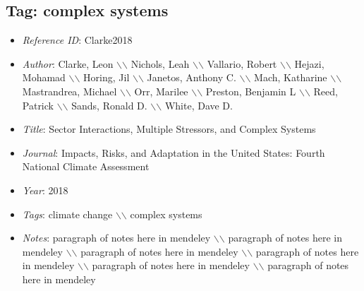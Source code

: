 \documentclass[11pt]{article}
\begin{document}
\subsection{Tag: complex systems} 
\noindent\citep{Clarke2018} 
\begin{itemize} 
\item{\textit{Reference ID}:  Clarke2018} 

\item{\textit{Author}:  Clarke, Leon $\backslash$$\backslash$ Nichols, Leah $\backslash$$\backslash$ Vallario, Robert $\backslash$$\backslash$ Hejazi, Mohamad $\backslash$$\backslash$ Horing, Jil $\backslash$$\backslash$ Janetos, Anthony C. $\backslash$$\backslash$ Mach, Katharine $\backslash$$\backslash$ Mastrandrea, Michael $\backslash$$\backslash$ Orr, Marilee $\backslash$$\backslash$ Preston, Benjamin L $\backslash$$\backslash$ Reed, Patrick $\backslash$$\backslash$ Sands, Ronald D. $\backslash$$\backslash$ White, Dave D.} 

\item{\textit{Title}:  Sector Interactions, Multiple Stressors, and Complex Systems} 

\item{\textit{Journal}:  Impacts, Risks, and Adaptation in the United States: Fourth National Climate Assessment} 

\item{\textit{Year}:  2018} 

\item{\textit{Tags}:  climate change $\backslash$$\backslash$ complex systems} 

\item{\textit{Notes}:  paragraph of notes here in mendeley $\backslash$$\backslash$ paragraph of notes here in mendeley $\backslash$$\backslash$ paragraph of notes here in mendeley $\backslash$$\backslash$ paragraph of notes here in mendeley $\backslash$$\backslash$ paragraph of notes here in mendeley $\backslash$$\backslash$ paragraph of notes here in mendeley} 

\end{itemize}\medskip
\end{document}
